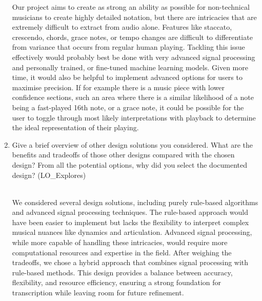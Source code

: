 \documentclass[12pt, titlepage]{article}
\begin{document}
\begin{enumerate}
  Our project aims to create as strong an ability as possible for non-technical musicians to create highly detailed notation, but there are intricacies that are extremely difficult to extract from audio alone. Features like staccato, crescendo, chords, grace notes, or tempo changes are difficult to differentiate from variance that occurs from regular human playing. Tackling this issue effectively would probably best be done with very advanced signal processing and personally trained, or fine-tuned machine learning models. Given more time, it would also be helpful to implement advanced options for users to maximise precision. If for example there is a music piece with lower confidence sections, such an area where there is a similar likelihood of a note being a fast-played 16th note, or a grace note, it could be possible for the user to toggle through most likely interpretations with playback to determine the ideal representation of their playing. \\
  \item Give a brief overview of other design solutions you considered.  What
  are the benefits and tradeoffs of those other designs compared with the chosen
  design?  From all the potential options, why did you select the documented design?
  (LO\_Explores)

  \\ We considered several design solutions, including purely rule-based algorithms and advanced signal processing techniques. The rule-based approach would have been easier to implement but lacks the flexibility to interpret complex musical nuances like dynamics and articulation. Advanced signal processing, while more capable of handling these intricacies, would require more computational resources and expertise in the field. After weighing the tradeoffs, we chose a hybrid approach that combines signal processing with rule-based methods. This design provides a balance between accuracy, flexibility, and resource efficiency, ensuring a strong foundation for transcription while leaving room for future refinement.
\end{enumerate}
\end{document}
